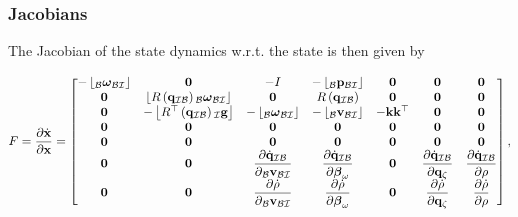 \documentclass{beamer}
\begin{document}
\begin{frame}
\frametitle{Jacobians}
The Jacobian of the state dynamics w.r.t. the state is then given
by

\tiny
\begin{equation}
F=\dfrac{\partial\dot{{\bf x}}}{\partial{\bf x}}=\begin{bmatrix}-\left\lfloor _{\mathcal{B}}\boldsymbol{\omega}_{\mathcal{B}\mathcal{I}}\right\rfloor  & {\bf 0} & -I & -\left\lfloor _{\mathcal{B}}{\bf p}_{\mathcal{B}\mathcal{I}}\right\rfloor  & {\bf 0} & {\bf 0} & {\bf 0}\\
{\bf 0} & \left\lfloor R\left({\bf q}_{\mathcal{I}\mathcal{B}}\right){}_{\mathcal{B}}\boldsymbol{\omega}_{\mathcal{B}\mathcal{I}}\right\rfloor  & {\bf 0} & R\left({\bf q}_{\mathcal{I}\mathcal{B}}\right) & {\bf 0} & {\bf 0} & {\bf 0}\\
{\bf 0} & -\left\lfloor R^{\top}\left({\bf q}_{\mathcal{I}\mathcal{B}}\right){}_{\mathcal{I}}{\bf g}\right\rfloor  & -\left\lfloor _{\mathcal{B}}\boldsymbol{\omega}_{\mathcal{B}\mathcal{I}}\right\rfloor  & -\left\lfloor _{\mathcal{B}}{\bf v}_{\mathcal{B}\mathcal{I}}\right\rfloor  & -{\bf k}{\bf k}^{\top} & {\bf 0} & {\bf 0}\\
{\bf 0} & {\bf 0} & {\bf 0} & {\bf 0} & {\bf 0} & {\bf 0} & {\bf 0}\\
{\bf 0} & {\bf 0} & {\bf 0} & {\bf 0} & {\bf 0} & {\bf 0} & {\bf 0}\\
{\bf 0} & {\bf 0} & \dfrac{\partial\dot{{\bf q}}_{\mathcal{I}\mathcal{B}}}{\partial{}_{\mathcal{B}}{\bf v}_{\mathcal{B}\mathcal{I}}} & \dfrac{\partial\dot{{\bf q}}_{\mathcal{I}\mathcal{B}}}{\partial\boldsymbol{\beta}_{\omega}} & {\bf 0} & \dfrac{\partial\dot{{\bf q}}_{\mathcal{I}\mathcal{B}}}{\partial{\bf q}_{\zeta}} & \dfrac{\partial\dot{{\bf q}}_{\mathcal{I}\mathcal{B}}}{\partial\rho}\\
{\bf 0} & {\bf 0} & \dfrac{\partial\dot{\rho}}{\partial{}_{\mathcal{B}}{\bf v}_{\mathcal{B}\mathcal{I}}} & \dfrac{\partial\dot{\rho}}{\partial\boldsymbol{\beta}_{\omega}} & {\bf 0} & \dfrac{\partial\dot{\rho}}{\partial{\bf q}_{\zeta}} & \dfrac{\partial\dot{\rho}}{\partial\rho}
\end{bmatrix},
\end{equation}
\end{frame}
\end{document}
